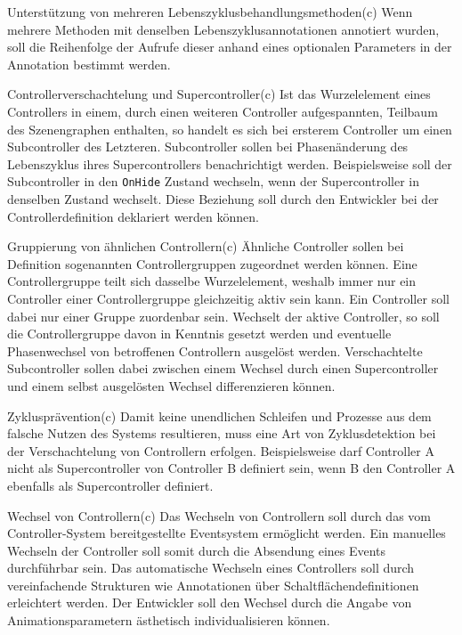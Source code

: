 \begin{freq}{Unterstützung von mehreren Lebenszyklusbehandlungsmethoden}(c)
	Wenn mehrere Methoden mit denselben Lebenszyklusannotationen annotiert wurden, soll die Reihenfolge der Aufrufe dieser anhand eines optionalen Parameters in der Annotation bestimmt werden.
\end{freq}
\begin{freq}{Controllerverschachtelung und Supercontroller}(c)
	Ist das Wurzelelement eines Controllers in einem, durch einen weiteren Controller aufgespannten, Teilbaum des Szenengraphen enthalten, so handelt es sich bei ersterem Controller um einen Subcontroller des Letzteren. Subcontroller sollen bei Phasenänderung des Lebenszyklus ihres Supercontrollers benachrichtigt werden. Beispielsweise soll der Subcontroller in den \texttt{OnHide} Zustand wechseln, wenn der Supercontroller in denselben Zustand wechselt. Diese Beziehung soll durch den Entwickler bei der Controllerdefinition deklariert werden können.
\end{freq}
\begin{freq}{Gruppierung von ähnlichen Controllern}(c)
	Ähnliche Controller sollen bei Definition sogenannten Controllergruppen zugeordnet werden können. Eine Controllergruppe teilt sich dasselbe Wurzelelement, weshalb immer nur ein Controller einer Controllergruppe gleichzeitig aktiv sein kann. Ein Controller soll dabei nur einer Gruppe zuordenbar sein. Wechselt der aktive Controller, so soll die Controllergruppe davon in Kenntnis gesetzt werden und eventuelle Phasenwechsel von betroffenen Controllern ausgelöst werden. Verschachtelte Subcontroller sollen dabei zwischen einem Wechsel durch einen Supercontroller und einem selbst ausgelösten Wechsel differenzieren können.
\end{freq}
\begin{freq}{Zyklusprävention}(c)
	Damit keine unendlichen Schleifen und Prozesse aus dem falsche Nutzen des Systems resultieren, muss eine Art von Zyklusdetektion bei der Verschachtelung von Controllern erfolgen. Beispielsweise darf Controller A nicht als Supercontroller von Controller B definiert sein, wenn B den Controller A ebenfalls als Supercontroller definiert.
\end{freq}
\begin{freq}{Wechsel von Controllern}(c)
	Das Wechseln von Controllern soll durch das vom Controller-System bereitgestellte Eventsystem ermöglicht werden. Ein manuelles Wechseln der Controller soll somit durch die Absendung eines Events durchführbar sein. Das automatische Wechseln eines Controllers soll durch vereinfachende Strukturen wie Annotationen über Schaltflächendefinitionen erleichtert werden. Der Entwickler soll den Wechsel durch die Angabe von Animationsparametern ästhetisch individualisieren können.
\end{freq}
